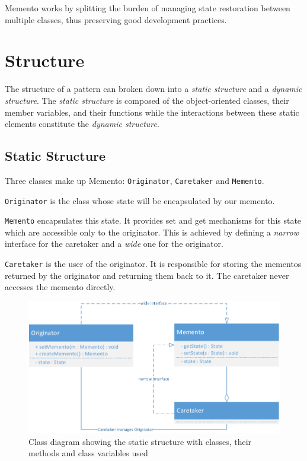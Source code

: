 \documentclass[11pt, a4paper, twoside]{article}
\begin{document}
	 Memento works by splitting the burden of managing state restoration between multiple classes, thus preserving good development practices.
	 	
	\section{Structure}
	The structure of a pattern can broken down into a \emph{static structure} and a \emph{dynamic structure}. The \emph{static structure} is composed of the object-oriented classes, their member variables, and their functions while the interactions between these static elements constitute the \emph{dynamic structure}. 
	
	\subsection{Static Structure}
	Three classes make up Memento: \verb|Originator|, \verb|Caretaker| and \verb|Memento|.
	
	\verb|Originator| is the class whose state will be encapsulated by our memento.
	
	\verb|Memento| encapsulates this state. It provides set and get mechanisms for this state which are accessible only to the originator. This is achieved by defining a \emph{narrow} interface for the caretaker and a \emph{wide} one for the originator.
	
	\verb|Caretaker| is the user of the originator. It is responsible for storing the mementos returned by the originator and returning them back to it. The caretaker never accesses the memento directly.
	
	\begin{figure}[htb]
		\begin{center}
			\includegraphics[width=\textwidth]{class_diagram.pdf}
			\caption{Class diagram showing the static structure with classes, their methods and class variables used}
			\label{fig:class}
		\end{center}
	\end{figure}
	
\end{document}

